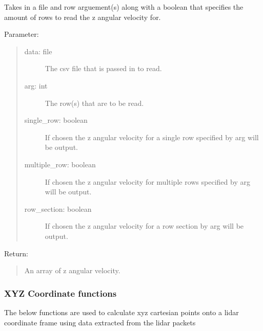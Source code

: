 \documentclass[letterpaper,10pt,english]{sphinxmanual}
\begin{document}
\begin{fulllineitems}
\label{\detokenize{Lidar extraction tool:imu_extract.get_z_ang_vel}}
Takes in a file and row arguement(s) along with a boolean that specifies the amount of rows to read the z angular velocity for.

Parameter:
\begin{quote}
\begin{description}
\item[{data: file}] \leavevmode
The csv file that is passed in to read.

\item[{arg: int}] \leavevmode
The row(s) that are to be read.

\item[{single\_row: boolean}] \leavevmode
If chosen the z angular velocity for a single row specified by arg will be output.

\item[{multiple\_row: boolean}] \leavevmode
If chosen the z angular velocity for multiple rows specified by arg will be output.

\item[{row\_section: boolean}] \leavevmode
If chosen the z angular velocity for a row section by arg will be output.

\end{description}
\end{quote}

Return:
\begin{quote}

An array of z angular velocity.
\end{quote}

\end{fulllineitems}



\subsubsection{XYZ Coordinate functions}
\label{\detokenize{Lidar extraction tool:xyz-coordinate-functions}}
The below functions are used to calculate xyz cartesian points onto a lidar coordinate frame using data extracted from the lidar packets

\label{\detokenize{Lidar extraction tool:module-xyz_calc}}
\end{document}
